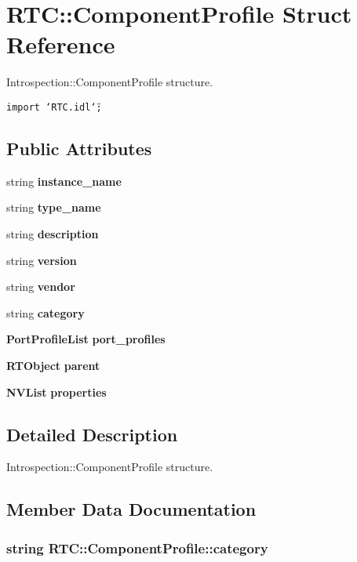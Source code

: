 \section{RTC::Component\-Profile Struct Reference}
\label{structRTC_1_1ComponentProfile}
Introspection::Component\-Profile structure.  


{\tt import \char`\"{}RTC.idl\char`\"{};}

\subsection*{Public Attributes}
\begin{CompactItemize}
\item 
string {\bf instance\_\-name}
\item 
string {\bf type\_\-name}
\item 
string {\bf description}
\item 
string {\bf version}
\item 
string {\bf vendor}
\item 
string {\bf category}
\item 
{\bf Port\-Profile\-List} {\bf port\_\-profiles}
\item 
{\bf RTObject} {\bf parent}
\item 
{\bf NVList} {\bf properties}
\end{CompactItemize}


\subsection{Detailed Description}
Introspection::Component\-Profile structure. 



\subsection{Member Data Documentation}
\subsubsection{\setlength{\rightskip}{0pt plus 5cm}string {\bf RTC::Component\-Profile::category}}\label{structRTC_1_1ComponentProfile_RTC_1_1ComponentProfileo5}


